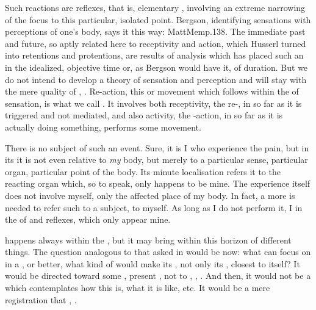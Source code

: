 Such reactions are {reflexes}, that is, elementary ,
involving an extreme narrowing of the focus to this particular, isolated point.
Bergson, identifying sensations with perceptions of one's body, says it this
way: 
\citet{The psychical state, then, that I call ``my present'', must be both a
  perception of immediate past and a determination of immediate future. Now, the
  immediate past, in so far as it is perceived, is, as we shall see,
  sensation,[...] and the immediate future, in so far as it is being determined,
  is action or movement.}{MattMem}{p.138. The immediate past
  and future, so aptly related here to receptivity and action, which Husserl
  turned into retentions and protentions, are results of analysis which has
  placed such an  in the idealized, objective time or,
  as Bergson would have it, of duration.  But we do not intend to develop a
  theory of sensation and perception and will stay with the mere quality of
  , .}
%
Re-action, this  or movement which follows within the  of
sensation, is what we call . It involves both receptivity, the re-, in
so far as it is triggered and not mediated, and also activity, the -action, in
so far as it is actually doing something, performs some movement.

There is no subject of such an event. Sure, it is I who experience the pain, but
in its  it is not even relative to {\em my} body, but merely to a
particular sense, particular organ, particular point of the body. Its minute
localisation refers it to the reacting organ which, so to speak, only happens to
be mine. The experience itself does not involve myself, only the affected place
of my body.  In fact, a more  is needed to refer such  to a subject, to myself. As long as I do not perform it, I
 in the  of  and {reflexes}, which only
 appear  mine.

\label{refl:A}  happens always within the
\hoa, but it may bring within this horizon  of different things. The
question analogous to that asked in  would be now:
what can  focus on in a , or
better, what kind of  would make its , not only its
, closest to itself? It would be directed toward some , present \herenow, not to , ,
. And then, it would not be a  which contemplates how
this  is, what it is like, etc. It would be a mere registration that
\thi{\ldots}, .

